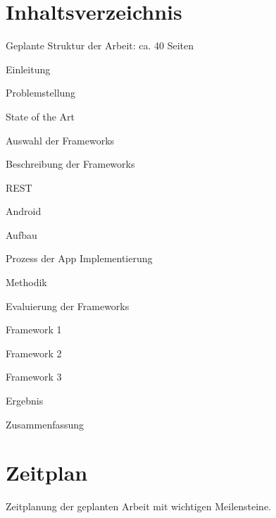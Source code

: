 \documentclass[a4paper,11pt,german,public]{INSOexpose}
\begin{document}
\section{Inhaltsverzeichnis}
Geplante Struktur der Arbeit: ca. 40 Seiten	
\begin{samepage}
  \begin{contentstructure}
    \item Einleitung	
    \item Problemstellung
    \item State of the Art 
    \begin{contentstructure}
      \item Auswahl der Frameworks 
      \item Beschreibung der Frameworks 
    \end{contentstructure}
    \item REST 
    \item Android 
    \begin{contentstructure}
      \item Aufbau 
      \item Prozess der App Implementierung 
    \end{contentstructure}
   \item Methodik 
    \item Evaluierung der Frameworks 
    \begin{contentstructure}
      \item Framework 1
      \item Framework 2 
      \item Framework 3 
    \end{contentstructure}
    \item Ergebnis 
    \item Zusammenfassung 
  \end{contentstructure}
\end{samepage}

\section{Zeitplan}
Zeitplanung der geplanten Arbeit mit wichtigen Meilensteine.
\end{document}

